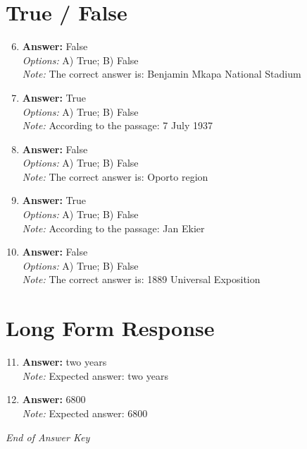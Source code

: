 \documentclass[12pt]{article}
\begin{document}
\section*{True / False}
\begin{enumerate}[label=\arabic*.]
\setcounter{enumi}{5}
\item \textbf{Answer:} False
\\ \textit{Options:} A) True; B) False
\\ \textit{Note:} The correct answer is: Benjamin Mkapa National Stadium
\item \textbf{Answer:} True
\\ \textit{Options:} A) True; B) False
\\ \textit{Note:} According to the passage: 7 July 1937
\item \textbf{Answer:} False
\\ \textit{Options:} A) True; B) False
\\ \textit{Note:} The correct answer is: Oporto region
\item \textbf{Answer:} True
\\ \textit{Options:} A) True; B) False
\\ \textit{Note:} According to the passage: Jan Ekier
\item \textbf{Answer:} False
\\ \textit{Options:} A) True; B) False
\\ \textit{Note:} The correct answer is: 1889 Universal Exposition
\end{enumerate}

\section*{Long Form Response}
\begin{enumerate}[label=\arabic*.]
\setcounter{enumi}{10}
\item \textbf{Answer:} two years
\\ \textit{Note:} Expected answer: two years
\item \textbf{Answer:} 6800
\\ \textit{Note:} Expected answer: 6800
\end{enumerate}

\vfill
\noindent\textit{End of Answer Key}
\end{document}
